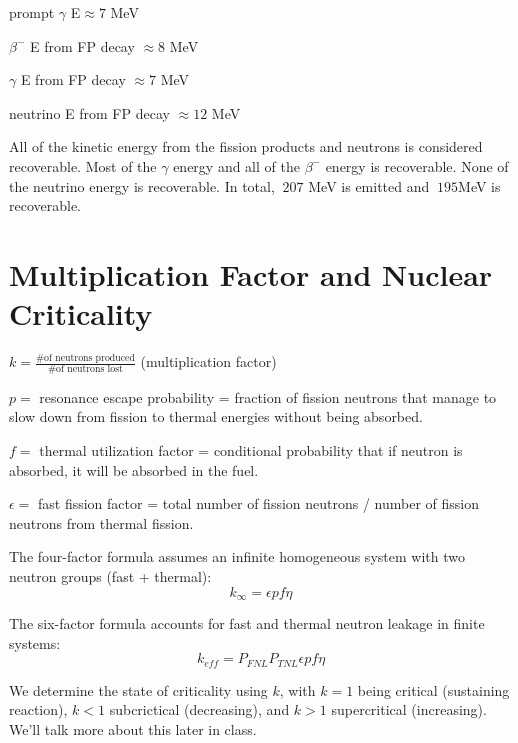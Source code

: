\documentclass[12pt]{article}
\begin{document}
prompt $\gamma$ E$\approx 7$ MeV

$\beta^- $ E from FP decay $\approx 8$ MeV

$\gamma $ E from FP decay $\approx 7$ MeV

neutrino E from FP decay $\approx 12$ MeV
\else
\vspace*{6 em}
\fi

All of the kinetic energy from the fission products and neutrons is considered recoverable. Most of the $\gamma$ energy and all of the $\beta^-$ energy is recoverable. None of the neutrino energy is recoverable. In total, $~207$ MeV is emitted and $~195$MeV is recoverable.

\section*{Multiplication Factor and Nuclear Criticality}

$k=\frac{\text{\# of neutrons produced}}{\text{\# of neutrons lost}}$ (multiplication factor)

$p=$ resonance escape probability = fraction of fission neutrons that manage to slow down from fission to thermal energies without being absorbed.

$f=$ thermal utilization factor = conditional probability that if neutron is absorbed, it will be absorbed in the fuel.

$\epsilon=$ fast fission factor = total number of fission neutrons / number of fission neutrons from thermal fission.

The four-factor formula assumes an infinite homogeneous system with two neutron groups (fast + thermal):
\[
k_{\infty}=\epsilon p f \eta
\]

The six-factor formula accounts for fast and thermal neutron leakage in finite systems:
\[
k_{eff} = P_{FNL}P_{TNL}\epsilon p f\eta
\]

We determine the state of criticality using $k$, with $k=1$ being critical (sustaining reaction), $k<1$ subcrictical (decreasing), and $k>1$ supercritical (increasing). We'll talk more about this later in class.
\end{document}
